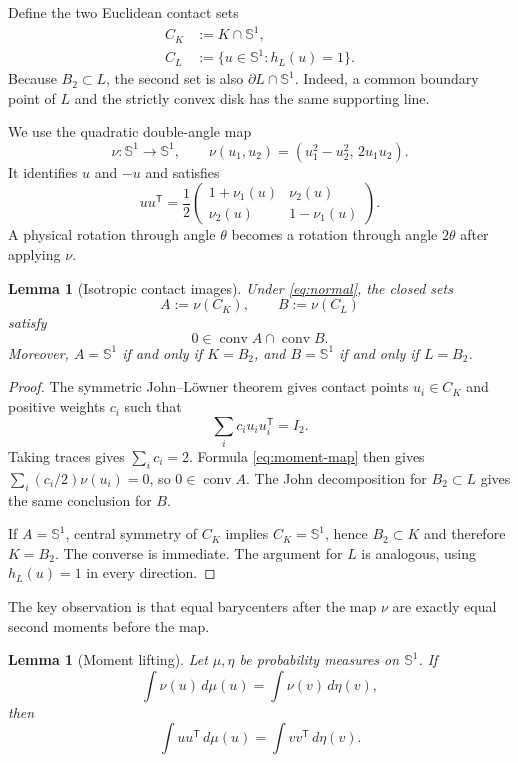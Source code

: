 \documentclass[11pt]{amsart}
\newtheorem{lemma}[theorem]{Lemma}
\theoremstyle{definition}
\theoremstyle{remark}
\newcommand{\Sph}{\mathbb S^1}
\newcommand{\B}{B_2}
\newcommand{\conv}{\operatorname{conv}}
\begin{document}
Define the two Euclidean contact sets
\begin{align*}
 C_K&:=K\cap\Sph,\\
 C_L&:=\{u\in\Sph:h_L(u)=1\}.
\end{align*}
Because $\B\subset L$, the second set is also $\partial L\cap\Sph$.  Indeed,
a common boundary point of $L$ and the strictly convex disk has the same
supporting line.

We use the quadratic double-angle map
\begin{equation}\label{eq:nu}
 \nu:\Sph\longrightarrow\Sph,
 \qquad
 \nu(u_1,u_2)=(u_1^2-u_2^2,\,2u_1u_2).
\end{equation}
It identifies $u$ and $-u$ and satisfies
\begin{equation}\label{eq:moment-map}
 uu^{\mathsf T}
 =\frac12
 \begin{pmatrix}
  1+\nu_1(u)&\nu_2(u)\\
  \nu_2(u)&1-\nu_1(u)
 \end{pmatrix}.
\end{equation}
A physical rotation through angle $\theta$ becomes a rotation through angle
$2\theta$ after applying $\nu$.

\begin{lemma}[Isotropic contact images]\label{lem:isotropic}
Under \eqref{eq:normal}, the closed sets
\[
 A:=\nu(C_K),\qquad B:=\nu(C_L)
\]
satisfy
\[
 0\in\conv A\cap\conv B.
\]
Moreover, $A=\Sph$ if and only if $K=\B$, and $B=\Sph$ if and only if
$L=\B$.
\end{lemma}

\begin{proof}
The symmetric John--L\"owner theorem gives contact points $u_i\in C_K$ and
positive weights $c_i$ such that \cite{John}
\[
 \sum_i c_i u_i u_i^{\mathsf T}=I_2.
\]
Taking traces gives $\sum_i c_i=2$.  Formula \eqref{eq:moment-map} then gives
$\sum_i(c_i/2)\nu(u_i)=0$, so $0\in\conv A$.  The John decomposition for
$\B\subset L$ gives the same conclusion for $B$.

If $A=\Sph$, central symmetry of $C_K$ implies $C_K=\Sph$, hence
$\B\subset K$ and therefore $K=\B$.  The converse is immediate.  The argument
for $L$ is analogous, using $h_L(u)=1$ in every direction.
\end{proof}

The key observation is that equal barycenters after the map $\nu$ are exactly
equal second moments before the map.

\begin{lemma}[Moment lifting]\label{lem:momentlift}
Let $\mu,\eta$ be probability measures on $\Sph$.  If
\[
 \int\nu(u)\,d\mu(u)=\int\nu(v)\,d\eta(v),
\]
then
\[
 \int uu^{\mathsf T}\,d\mu(u)
 =\int vv^{\mathsf T}\,d\eta(v).
\]
\end{lemma}
\end{document}
